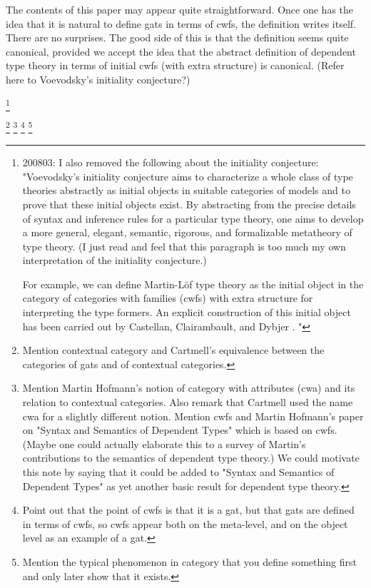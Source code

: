 \documentclass{lmcs}
\begin{document}
The contents of this paper may appear quite straightforward. Once one has the idea that it is natural to define gats in terms of cwfs, the definition writes itself. There are no surprises. The good side of this is that the definition seems quite canonical, provided we accept the idea that the abstract definition of dependent type theory in terms of initial cwfs (with extra structure) is canonical. (Refer here to Voevodsky's initiality conjecture?)

\footnote{200803: I also removed the following about the initiality conjecture: "Voevodsky's initiality conjecture \cite{voevodsky:initiality} aims to characterize a whole class of type theories abstractly as initial objects in suitable categories of models and to prove that these initial objects exist. By abstracting from the precise details of syntax and inference rules for a particular type theory, one aims to develop a more general, elegant, semantic, rigorous, and formalizable metatheory of type theory. (I just read  \cite{voevodsky:initiality} and feel that this paragraph is too much my own interpretation of the initiality conjecture.)

For example, we can define Martin-Löf type theory as the initial object in the category of categories with families (cwfs) with extra structure for interpreting the type formers. An explicit construction of this initial object has been carried out by Castellan, Clairambault, and Dybjer \cite{castellan:tlca2015,castellan:lmcs}. "}

\footnote{
Mention contextual category and Cartmell's equivalence between the categories of gats and of contextual categories. 
}
\footnote
{Mention Martin Hofmann's notion of category with attributes (cwa) and its relation to contextual categories. Also remark that Cartmell used the name cwa for a slightly different notion. Mention cwfs and Martin Hofmann's paper on "Syntax and Semantics of Dependent Types" which is based on cwfs. (Maybe one could actually elaborate this to a survey of Martin's contributions to the semantics of dependent type theory.) We could motivate this note by saying that it could be added to "Syntax and Semantics of Dependent Types" as yet another basic result for dependent type theory.
}
\footnote
{Point out that the point of cwfs is that it is a gat, but that gats are defined in terms of cwfs, so cwfs appear both on the meta-level, and on the object level as an example of a gat.}
\footnote
{Mention the typical phenomenon in category that you define something first and only later show that it exists.}
\end{document}
